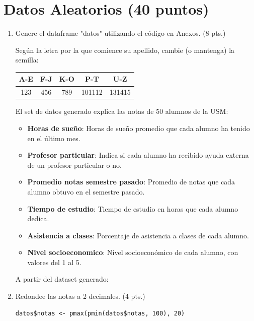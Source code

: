 \documentclass[letterpaper,11pt]{article}
\begin{document}
\section{Datos Aleatorios (40 puntos)}
\begin{enumerate}
    \item Genere el dataframe "datos" utilizando el código en Anexos. (8 pts.)

Según la letra por la que comience su apellido, cambie (o mantenga) la semilla:

\begin{table}[htbp]
\centering
\begin{tabular}{|c|c|c|c|c|}
\hline
\textbf{A-E} & \textbf{F-J} & \textbf{K-O} & \textbf{P-T} & \textbf{U-Z} \\
\hline
123 & 456 & 789 & 101112 & 131415 \\
\hline
\end{tabular}
\label{tabla:division-alfabeto}
\end{table}

El set de datos generado explica las notas de 50 alumnos de la USM:

\begin{itemize}
    \item \textbf{Horas de sueño}: Horas de sueño promedio que cada alumno ha tenido en el último mes.
    \item \textbf{Profesor particular}: Indica si cada alumno ha recibido ayuda externa de un profesor particular o no.
    \item \textbf{Promedio notas semestre pasado}: Promedio de notas que cada alumno obtuvo en el semestre pasado.
    \item \textbf{Tiempo de estudio}: Tiempo de estudio en horas que cada alumno dedica.
    \item \textbf{Asistencia a clases}: Porcentaje de asistencia a clases de cada alumno.
    \item \textbf{Nivel socioeconomico}: Nivel socioeconómico de cada alumno, con valores del 1 al 5.
\end{itemize}

A partir del dataset generado:
    \item Redondee las notas a 2 decimales. (4 pts.)

\begin{lstlisting}
datos$notas <- pmax(pmin(datos$notas, 100), 20)
\end{lstlisting}


\end{enumerate}
\end{document}
